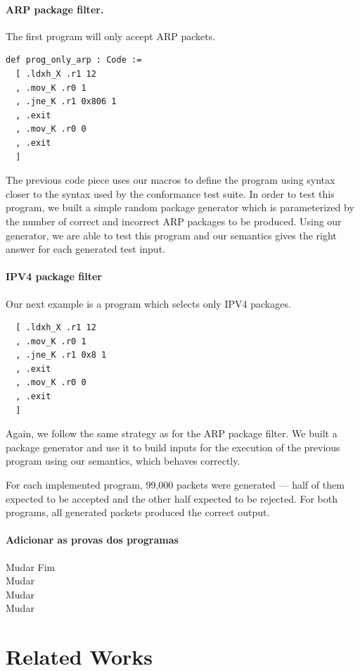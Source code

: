 \documentclass[sigconf]{acmart}
\begin{document}
\paragraph{ARP package filter.} The first program will only accept ARP packets.
\begin{verbatim}
def prog_only_arp : Code :=
  [ .ldxh_X .r1 12
  , .mov_K .r0 1
  , .jne_K .r1 0x806 1
  , .exit
  , .mov_K .r0 0
  , .exit
  ]

\end{verbatim}
The previous code piece uses our macros to define the program using syntax 
closer to the syntax used by the conformance test suite.
In order to test this program, we built a simple random package generator 
which is parameterized by the number of correct and incorrect ARP packages to be 
produced. Using our generator, we are able to test this program and our semantics 
gives the right answer for each generated test input.

\paragraph{IPV4 package filter} Our next example is a program which selects only
IPV4 packages.

\begin{verbatim}
  [ .ldxh_X .r1 12
  , .mov_K .r0 1
  , .jne_K .r1 0x8 1
  , .exit
  , .mov_K .r0 0
  , .exit
  ]
\end{verbatim}
Again, we follow the same strategy as for the ARP package filter. We built a 
package generator and use it to build inputs for the execution of the previous 
program using our semantics, which behaves correctly.

For each implemented program, 99,000 packets were generated — half of them expected to be accepted and the other half expected to be rejected. For both programs, all generated packets produced the correct output.

\paragraph{Adicionar as provas dos programas}

Mudar Fim\\ 
Mudar\\
Mudar\\
Mudar\\


\section{Related Works}\label{sec:related}
\end{document}
